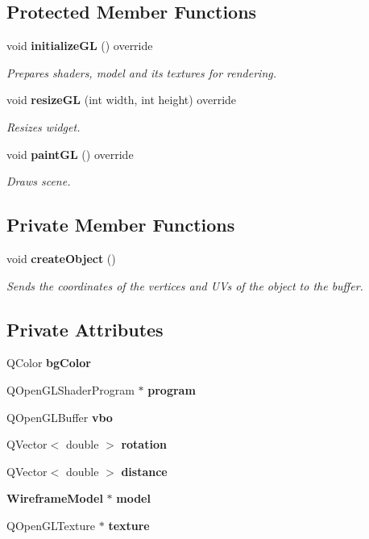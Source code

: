 \subsection*{Protected Member Functions}
\begin{DoxyCompactItemize}
\item 
void \textbf{ initialize\+GL} () override
\begin{DoxyCompactList}\small\item\em Prepares shaders, model and it\textquotesingle{}s textures for rendering. \end{DoxyCompactList}\item 
void \textbf{ resize\+GL} (int width, int height) override
\begin{DoxyCompactList}\small\item\em Resizes widget. \end{DoxyCompactList}\item 
void \textbf{ paint\+GL} () override
\begin{DoxyCompactList}\small\item\em Draws scene. \end{DoxyCompactList}\end{DoxyCompactItemize}
\subsection*{Private Member Functions}
\begin{DoxyCompactItemize}
\item 
void \textbf{ create\+Object} ()
\begin{DoxyCompactList}\small\item\em Sends the coordinates of the vertices and UV\textquotesingle{}s of the object to the buffer. \end{DoxyCompactList}\end{DoxyCompactItemize}
\subsection*{Private Attributes}
\begin{DoxyCompactItemize}
\item 
Q\+Color \textbf{ bg\+Color}
\item 
Q\+Open\+G\+L\+Shader\+Program $\ast$ \textbf{ program}
\item 
Q\+Open\+G\+L\+Buffer \textbf{ vbo}
\item 
Q\+Vector$<$ double $>$ \textbf{ rotation}
\item 
Q\+Vector$<$ double $>$ \textbf{ distance}
\item 
\textbf{ Wireframe\+Model} $\ast$ \textbf{ model}
\item 
Q\+Open\+G\+L\+Texture $\ast$ \textbf{ texture}
\end{DoxyCompactItemize}


